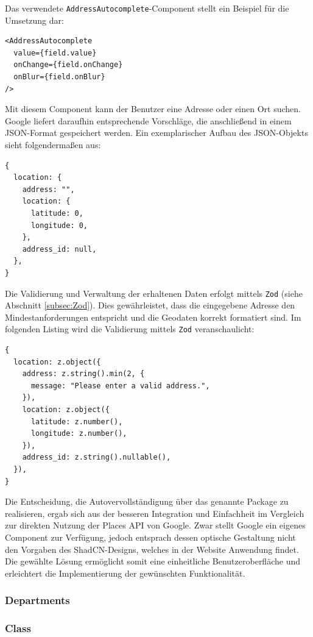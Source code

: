 \begin{inhalt}
Das verwendete \texttt{AddressAutocomplete}-Component stellt ein Beispiel für die Umsetzung dar:

\begin{lstlisting}[style=mytsx]
<AddressAutocomplete
  value={field.value}
  onChange={field.onChange}
  onBlur={field.onBlur}
/>
\end{lstlisting}

Mit diesem Component kann der Benutzer eine Adresse oder einen Ort suchen. Google liefert daraufhin entsprechende Vorschläge, die anschließend in einem JSON-Format gespeichert werden. Ein exemplarischer Aufbau des JSON-Objekts sieht folgendermaßen aus:

\begin{lstlisting}[style=myjson]
{
  location: {
    address: "",
    location: {
      latitude: 0,
      longitude: 0,
    },
    address_id: null,
  },
}
\end{lstlisting}

Die Validierung und Verwaltung der erhaltenen Daten erfolgt mittels \texttt{Zod} (siehe Abschnitt \ref{subsec:Zod}). Dies gewährleistet, dass die eingegebene Adresse den Mindestanforderungen entspricht und die Geodaten korrekt formatiert sind. Im folgenden Listing wird die Validierung mittels \texttt{Zod} veranschaulicht:

\begin{lstlisting}[style=myjson]
{
  location: z.object({
    address: z.string().min(2, {
      message: "Please enter a valid address.",
    }),
    location: z.object({
      latitude: z.number(),
      longitude: z.number(),
    }),
    address_id: z.string().nullable(),
  }),
}
\end{lstlisting}

Die Entscheidung, die Autovervollständigung über das genannte Package zu realisieren, ergab sich aus der besseren Integration und Einfachheit im Vergleich zur direkten Nutzung der Places API von Google. Zwar stellt Google ein eigenes Component zur Verfügung, jedoch entsprach dessen optische Gestaltung nicht den Vorgaben des ShadCN-Designs, welches in der Website Anwendung findet. Die gewählte Lösung ermöglicht somit eine einheitliche Benutzeroberfläche und erleichtert die Implementierung der gewünschten Funktionalität.


\subsubsection{Departments}

\subsubsection{Class}


\end{inhalt}
